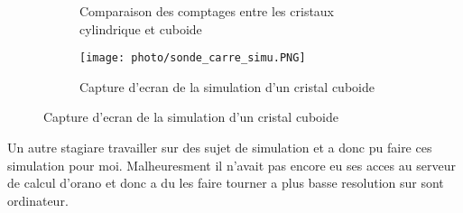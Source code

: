 \begin{figure}
    \centering
    \begin{subfigure}[t]{0.49\textwidth}
        \centering
        \caption{Comparaison des comptages entre les cristaux cylindrique et cuboide}
    \end{subfigure}
    \begin{subfigure}[t]{0.49\textwidth}
        \centering
        \texttt{[image: photo/sonde\_carre\_simu.PNG]}

        \caption{Capture d'ecran de la simulation d'un cristal cuboide}
        
    \end{subfigure}
\end{figure}

Un autre stagiare travailler sur des sujet de simulation et a donc pu faire ces simulation pour moi. Malheuresment il n'avait pas encore eu ses acces au serveur de calcul d'orano et donc a du les faire tourner a plus basse resolution sur sont ordinateur.

